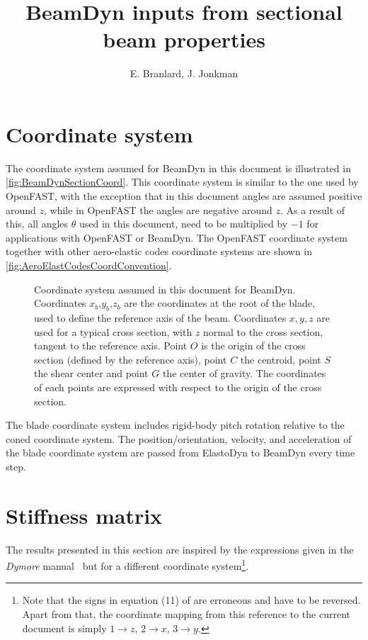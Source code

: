 \documentclass[11pt]{article}
\newcommand{\svgtex}[4]{\begin{figure}[!htb]%
 \centering%
 \def\svgwidth{#3\columnwidth}%
 \scalebox{#4}{{#1}}%
 \caption{#2}\label{fig:#1}%
 \end{figure}%
}
\begin{document}
\title{BeamDyn inputs from sectional beam properties}
\author{E. Branlard, J. Jonkman}
\maketitle


\section{Coordinate system}
The coordinate system assumed for BeamDyn in this document is illustrated in \autoref{fig:BeamDynSectionCoord}. 
This coordinate system is similar to the one used by OpenFAST, with the exception that in this document angles are assumed positive around $z$, while in OpenFAST the angles are negative around $z$. As a result of this, all angles $\theta$ used in this document, need to be multiplied by $-1$ for applications with OpenFAST or BeamDyn. The OpenFAST coordinate system together with other aero-elastic codes coordinate systems are shown in  \autoref{fig:AeroElastCodesCoordConvention}.
% 
\svgtex{BeamDynSectionCoord}{Coordinate system assumed in this document for BeamDyn. Coordinates $x_b$,$y_b$,$z_b$ are the coordinates at the root of the blade, used to define the reference axis of the beam. Coordinates $x,y,z$ are used for a typical cross section, with $z$ normal to the cross section, tangent to the reference axis. Point $O$ is the origin of the cross section (defined by the reference axis), point $C$ the centroid, point $S$ the shear center and point $G$ the center of gravity. The coordinates of each points are expressed with respect to the origin of the cross section.}{1.0}{0.90}
The blade coordinate system includes rigid-body pitch rotation relative to the coned coordinate system.
The position/orientation, velocity, and acceleration of the blade coordinate system are passed from ElastoDyn to BeamDyn every time step.


\section{Stiffness matrix}
The results presented in this section are inspired by the expressions given in the \textit{Dymore} manual~\cite{dymore} but for a different coordinate system\footnote{Note that the signs in equation (11) of \cite{dymore} are erroneous and have to be reversed. Apart from that, the coordinate mapping from this reference to the current document is simply $1\to z$, $2\to x$, $3\to y$.}.
\end{document}
